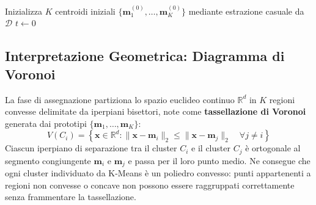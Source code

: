 \begin{algorithm}[htbp]
\SetAlgoLined
{}
Inizializza $K$ centroidi iniziali $\{\mathbf{m}_1^{(0)}, \dots, \mathbf{m}_K^{(0)}\}$ mediante estrazione casuale da $\mathcal{D}$\;
$t \leftarrow 0$\;
\caption{Algoritmo standard di K-Means (Lloyd).}
\label{alg:dm-kmeans-lloyd}
\end{algorithm}

\subsection{Interpretazione Geometrica: Diagramma di Voronoi}

La fase di assegnazione partiziona lo spazio euclideo continuo $\mathbb{R}^d$ in $K$ regioni convesse delimitate da iperpiani bisettori, note come \textbf{tassellazione di Voronoi} generata dai prototipi $\{\mathbf{m}_1, \dots, \mathbf{m}_K\}$:
\begin{equation}
    V(C_i) = \left\{ \mathbf{x} \in \mathbb{R}^d : \|\mathbf{x} - \mathbf{m}_i\|_2 \le \|\mathbf{x} - \mathbf{m}_j\|_2 \quad \forall j \ne i \right\}
\end{equation}
Ciascun iperpiano di separazione tra il cluster $C_i$ e il cluster $C_j$ è ortogonale al segmento congiungente $\mathbf{m}_i$ e $\mathbf{m}_j$ e passa per il loro punto medio. Ne consegue che ogni cluster individuato da K-Means è un poliedro convesso: punti appartenenti a regioni non convesse o concave non possono essere raggruppati correttamente senza frammentare la tassellazione.

